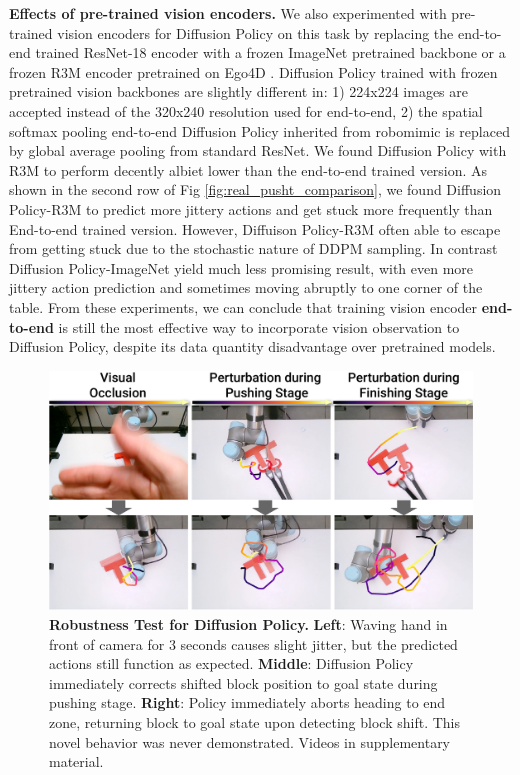 \textbf{Effects of pre-trained vision encoders.}
We also experimented with pre-trained vision encoders for Diffusion Policy on this task by replacing the end-to-end trained ResNet-18 encoder with a frozen ImageNet \cite{deng2009imagenet} pretrained backbone or a frozen R3M encoder \cite{nair2022r3m} pretrained on Ego4D \cite{grauman2022ego4d}. Diffusion Policy trained with frozen pretrained vision backbones are slightly different in: 1) 224x224 images are accepted instead of the 320x240 resolution used for end-to-end, 2) the spatial softmax pooling end-to-end Diffusion Policy inherited from robomimic \cite{robomimic} is replaced by global average pooling from standard ResNet. We found Diffusion Policy with R3M to perform decently albiet lower than the end-to-end trained version. As shown in the second row of Fig \ref{fig:real_pusht_comparison}, we found Diffusion Policy-R3M to predict more jittery actions and get stuck more frequently than End-to-end trained version. However, Diffuison Policy-R3M often able to escape from getting stuck due to the stochastic nature of DDPM sampling. In contrast Diffusion Policy-ImageNet yield much less promising result, with even more jittery action prediction and sometimes moving abruptly to one corner of the table. From these experiments, we can conclude that training vision encoder \textbf{end-to-end} is still the most effective way to incorporate vision observation to Diffusion Policy, despite its data quantity disadvantage over pretrained models.

\begin{figure}[t]
\centering
\includegraphics[width=\linewidth]{figure/real_robustness.pdf}

\caption{\textbf{Robustness Test for Diffusion Policy.}
\label{fig:robustness}
\textbf{Left}: Waving hand in front of camera for 3 seconds causes slight jitter, but the predicted actions still function as expected.
\textbf{Middle}: Diffusion Policy immediately corrects shifted block position to goal state during pushing stage.
\textbf{Right}: Policy immediately aborts heading to end zone, returning block to goal state upon detecting block shift. This novel behavior was never demonstrated.
Videos in supplementary material.}
\vspace{-2mm}
\end{figure}

